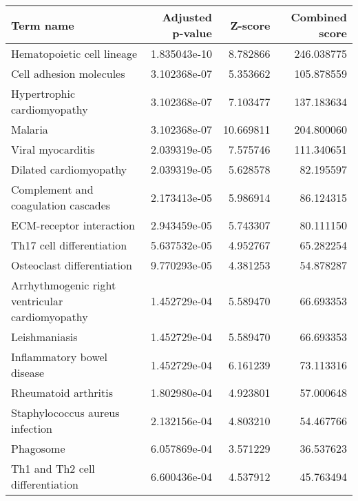 \begin{tabular}{lrrr}
\toprule
                                         Term name &  Adjusted p-value &   Z-score &  Combined score \\
\midrule
                        Hematopoietic cell lineage &      1.835043e-10 &  8.782866 &      246.038775 \\
                           Cell adhesion molecules &      3.102368e-07 &  5.353662 &      105.878559 \\
                       Hypertrophic cardiomyopathy &      3.102368e-07 &  7.103477 &      137.183634 \\
                                           Malaria &      3.102368e-07 & 10.669811 &      204.800060 \\
                                 Viral myocarditis &      2.039319e-05 &  7.575746 &      111.340651 \\
                            Dilated cardiomyopathy &      2.039319e-05 &  5.628578 &       82.195597 \\
               Complement and coagulation cascades &      2.173413e-05 &  5.986914 &       86.124315 \\
                          ECM-receptor interaction &      2.943459e-05 &  5.743307 &       80.111150 \\
                         Th17 cell differentiation &      5.637532e-05 &  4.952767 &       65.282254 \\
                        Osteoclast differentiation &      9.770293e-05 &  4.381253 &       54.878287 \\
   Arrhythmogenic right ventricular cardiomyopathy &      1.452729e-04 &  5.589470 &       66.693353 \\
                                     Leishmaniasis &      1.452729e-04 &  5.589470 &       66.693353 \\
                        Inflammatory bowel disease &      1.452729e-04 &  6.161239 &       73.113316 \\
                              Rheumatoid arthritis &      1.802980e-04 &  4.923801 &       57.000648 \\
                   Staphylococcus aureus infection &      2.132156e-04 &  4.803210 &       54.467766 \\
                                         Phagosome &      6.057869e-04 &  3.571229 &       36.537623 \\
                  Th1 and Th2 cell differentiation &      6.600436e-04 &  4.537912 &       45.763494 \\

\end{tabular}
